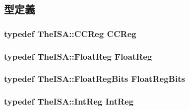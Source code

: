 \subsection{型定義}
\hypertarget{classPhysRegFile_a0c9de550a32808e6a25b54b6c791d5ab}{
\subsubsection[{CCReg}]{\setlength{\rightskip}{0pt plus 5cm}typedef TheISA::CCReg {\bf CCReg}}}
\label{classPhysRegFile_a0c9de550a32808e6a25b54b6c791d5ab}
\hypertarget{classPhysRegFile_a75484259f1855aabc8d74c6eb1cfe186}{
\subsubsection[{FloatReg}]{\setlength{\rightskip}{0pt plus 5cm}typedef TheISA::FloatReg {\bf FloatReg}}}
\label{classPhysRegFile_a75484259f1855aabc8d74c6eb1cfe186}
\hypertarget{classPhysRegFile_aab5eeae86499f9bfe15ef79360eccc64}{
\subsubsection[{FloatRegBits}]{\setlength{\rightskip}{0pt plus 5cm}typedef TheISA::FloatRegBits {\bf FloatRegBits}}}
\label{classPhysRegFile_aab5eeae86499f9bfe15ef79360eccc64}
\hypertarget{classPhysRegFile_a1355cb78d031430d4d70eb5080267604}{
\subsubsection[{IntReg}]{\setlength{\rightskip}{0pt plus 5cm}typedef TheISA::IntReg {\bf IntReg}}}
\label{classPhysRegFile_a1355cb78d031430d4d70eb5080267604}


